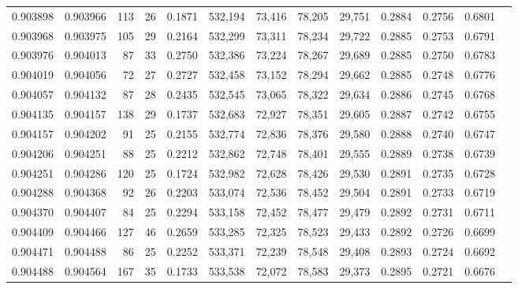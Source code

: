 \begin{tabular}{rrrrrrrrrrrrr}
0.903898 & 0.903966 &   113 &  26 &                                     0.1871 & 532,194 &  73,416 &  78,205 &  29,751 & 0.2884 & 0.2756 & 0.6801 \\
0.903968 & 0.903975 &   105 &  29 &                                     0.2164 & 532,299 &  73,311 &  78,234 &  29,722 & 0.2885 & 0.2753 & 0.6791 \\
0.903976 & 0.904013 &    87 &  33 &                                     0.2750 & 532,386 &  73,224 &  78,267 &  29,689 & 0.2885 & 0.2750 & 0.6783 \\
0.904019 & 0.904056 &    72 &  27 &                                     0.2727 & 532,458 &  73,152 &  78,294 &  29,662 & 0.2885 & 0.2748 & 0.6776 \\
0.904057 & 0.904132 &    87 &  28 &                                     0.2435 & 532,545 &  73,065 &  78,322 &  29,634 & 0.2886 & 0.2745 & 0.6768 \\
0.904135 & 0.904157 &   138 &  29 &                                     0.1737 & 532,683 &  72,927 &  78,351 &  29,605 & 0.2887 & 0.2742 & 0.6755 \\
0.904157 & 0.904202 &    91 &  25 &                                     0.2155 & 532,774 &  72,836 &  78,376 &  29,580 & 0.2888 & 0.2740 & 0.6747 \\
0.904206 & 0.904251 &    88 &  25 &                                     0.2212 & 532,862 &  72,748 &  78,401 &  29,555 & 0.2889 & 0.2738 & 0.6739 \\
0.904251 & 0.904286 &   120 &  25 &                                     0.1724 & 532,982 &  72,628 &  78,426 &  29,530 & 0.2891 & 0.2735 & 0.6728 \\
0.904288 & 0.904368 &    92 &  26 &                                     0.2203 & 533,074 &  72,536 &  78,452 &  29,504 & 0.2891 & 0.2733 & 0.6719 \\
0.904370 & 0.904407 &    84 &  25 &                                     0.2294 & 533,158 &  72,452 &  78,477 &  29,479 & 0.2892 & 0.2731 & 0.6711 \\
0.904409 & 0.904466 &   127 &  46 &                                     0.2659 & 533,285 &  72,325 &  78,523 &  29,433 & 0.2892 & 0.2726 & 0.6699 \\
0.904471 & 0.904488 &    86 &  25 &                                     0.2252 & 533,371 &  72,239 &  78,548 &  29,408 & 0.2893 & 0.2724 & 0.6692 \\
0.904488 & 0.904564 &   167 &  35 &                                     0.1733 & 533,538 &  72,072 &  78,583 &  29,373 & 0.2895 & 0.2721 & 0.6676 \\

\end{tabular}

